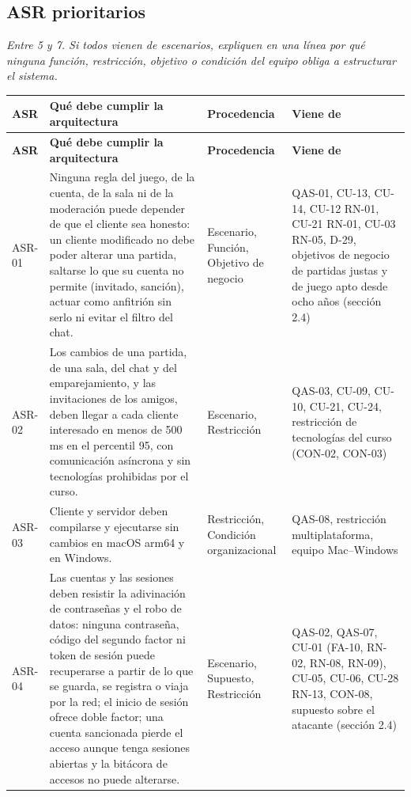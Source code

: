 \documentclass[11pt,letterpaper]{article}
\newcommand{\hint}[1]{{\itshape\color{black!70}#1}\par} %
\newcommand{\hd}[1]{\textbf{\small #1}}
\newcommand{\headrow}{\rowcolor{SADHead}}
\begin{document}
\subsection{ASR prioritarios}
\hint{Entre 5 y 7. Si todos vienen de escenarios, expliquen en una línea por qué ninguna función, restricción, objetivo o condición del equipo obliga a estructurar el sistema.}
\begin{xltabular}{\linewidth}{|p{1.7cm}|Y|Y|Y|}\hline
  \headrow\hd{ASR} & \hd{Qué debe cumplir la arquitectura} & \hd{Procedencia} & \hd{Viene de}\\\hline
  \endfirsthead
  \headrow\hd{ASR} & \hd{Qué debe cumplir la arquitectura} & \hd{Procedencia} & \hd{Viene de}\\\hline
  \endhead
  ASR-01 & Ninguna regla del juego, de la cuenta, de la sala ni de la moderación puede depender de que el cliente sea honesto: un cliente modificado no debe poder alterar una partida, saltarse lo que su cuenta no permite (invitado, sanción), actuar como anfitrión sin serlo ni evitar el filtro del chat. & Escenario, Función, Objetivo de negocio & QAS-01, CU-13, CU-14, CU-12 RN-01, CU-21 RN-01, CU-03 RN-05, D-29, objetivos de negocio de partidas justas y de juego apto desde ocho años (sección 2.4)\\\hline
  ASR-02 & Los cambios de una partida, de una sala, del chat y del emparejamiento, y las invitaciones de los amigos, deben llegar a cada cliente interesado en menos de 500 ms en el percentil 95, con comunicación asíncrona y sin tecnologías prohibidas por el curso. & Escenario, Restricción & QAS-03, CU-09, CU-10, CU-21, CU-24, restricción de tecnologías del curso (CON-02, CON-03)\\\hline
  ASR-03 & Cliente y servidor deben compilarse y ejecutarse sin cambios en macOS arm64 y en Windows. & Restricción, Condición organizacional & QAS-08, restricción multiplataforma, equipo Mac–Windows\\\hline
  ASR-04 & Las cuentas y las sesiones deben resistir la adivinación de contraseñas y el robo de datos: ninguna contraseña, código del segundo factor ni token de sesión puede recuperarse a partir de lo que se guarda, se registra o viaja por la red; el inicio de sesión ofrece doble factor; una cuenta sancionada pierde el acceso aunque tenga sesiones abiertas y la bitácora de accesos no puede alterarse. & Escenario, Supuesto, Restricción & QAS-02, QAS-07, CU-01 (FA-10, RN-02, RN-08, RN-09), CU-05, CU-06, CU-28 RN-13, CON-08, supuesto sobre el atacante (sección 2.4)\\\hline

\end{xltabular}
\end{document}
